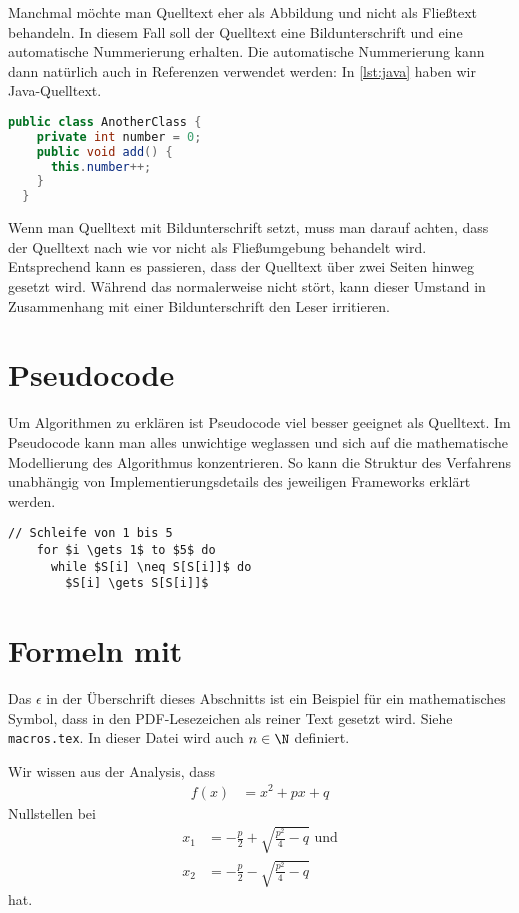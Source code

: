 Manchmal möchte man Quelltext eher als Abbildung und nicht als Fließtext behandeln. In diesem Fall soll der Quelltext eine Bildunterschrift und eine automatische Nummerierung erhalten. Die automatische Nummerierung kann dann natürlich auch in Referenzen verwendet werden: In \vref{lst:java} haben wir Java-Quelltext.

\begin{lstlisting}[language=Java,gobble=2,caption={Ich bin die Bildunterschrift des Quelltextes},label=lst:java]
  public class AnotherClass {
    private int number = 0;
    public void add() {
      this.number++;
    }
  }
\end{lstlisting}

Wenn man Quelltext mit Bildunterschrift setzt, muss man darauf achten, dass der Quelltext nach wie vor nicht als Fließumgebung behandelt wird. Entsprechend kann es passieren, dass der Quelltext über zwei Seiten hinweg gesetzt wird. Während das normalerweise nicht stört, kann dieser Umstand in Zusammenhang mit einer Bildunterschrift den Leser irritieren.

\section{Pseudocode}

Um Algorithmen zu erklären ist Pseudocode viel besser geeignet als Quelltext. Im Pseudocode kann man alles unwichtige weglassen und sich auf die mathematische Modellierung des Algorithmus konzentrieren. So kann die Struktur des Verfahrens unabhängig von Implementierungsdetails des jeweiligen Frameworks erklärt werden.

\begin{lstlisting}[style=pseudo,gobble=2]
  // Schleife von 1 bis 5
    for $i \gets 1$ to $5$ do
      while $S[i] \neq S[S[i]]$ do
        $S[i] \gets S[S[i]]$
\end{lstlisting}

\section{Formeln mit \pdfepsilon}

Das $\epsilon$ in der Überschrift dieses Abschnitts ist ein Beispiel für ein mathematisches Symbol, dass in den PDF-Lesezeichen als reiner Text gesetzt wird. Siehe \texttt{macros.tex}. In dieser Datei wird auch $n \in \N$ definiert.

Wir wissen aus der Analysis, dass
\begin{align}
  f(x) &= x^2 + px + q
\end{align}
Nullstellen bei
\begin{align}
  x_1 &= -\frac p2 + \sqrt{\frac{p^2}4 - q} \text{ und}\\
  x_2 &= -\frac p2 - \sqrt{\frac{p^2}4 - q}
\end{align}
hat.

